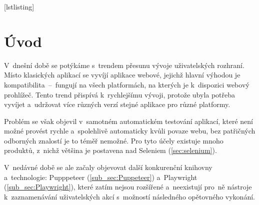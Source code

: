 \documentclass[12pt, a4paper, twoside]{article}
\begin{document}
	
\makeatletter


	[lstlisting]%
	\renewcommand*{\thellabel}{%
		\ifnum\value{llabel}<0 %
		\@ctrerr
		\else
		\ifnum\value{llabel}>10 %
		\@ctrerr
		\else
		\protect\ding{\the\numexpr\value{llabel}+201\relax}%
		\fi
		\fi
	}%

\newlength{\llabelsep}
\setlength{\llabelsep}{5pt}

\newcommand*{\llabel}[1]{%
	\begingroup
	\refstepcounter{llabel}%
	\label{#1}%
	\llap{%
		\thellabel\kern\llabelsep
		\hphantom{\lst@numberstyle\the\lst@lineno}%
		\kern\lst@numbersep
	}%
	\endgroup
}
\makeatother
	
	
	
	
	
	\ifdefined\printVersion
	\else
		\afterpage{\aftergroup\restoregeometry}
	\fi
		
	\tableofcontents
	\onehalfspacing
	\newpage
	\printglossary[title=Seznam nestandardních a~méně známých zkratek, toctitle=Seznam nestandardních a~méně známých zkratek, type=\acronymtype]
	\newpage
	\section{Úvod}
	V~dnešní době se potýkáme s~trendem přesunu vývoje uživatelských rozhraní. Místo klasických aplikací se vyvíjí aplikace webové, jejichž hlavní výhodou je kompatibilita~--~fungují na všech platformách, na kterých je k~dispozici webový prohlížeč. Tento trend přispívá k~rychlejšímu vývoji, protože ubyla potřeba vyvíjet a~udržovat více různých verzí stejné aplikace pro různé platformy. 
	
	Problém se však objevil v~samotném automatickém testování aplikací, které není možné provést rychle a~spolehlivě automaticky kvůli povaze webu, bez patřičných odborných znalostí je to téměř nemožné. Pro tyto účely existuje mnoho produktů, z~nichž většina je postavena nad Seleniem (\ref{sec:selenium}). 
	
	V~nedávné době se ale začaly objevovat další konkurenční knihovny a~technologie: Pupppeteer (\ref{sub_sec:Puppeteer}) a~Playwright (\ref{sub_sec:Playwright}), které zatím nejsou rozšířené a~neexistují pro~ně nástroje k~zaznamenávání uživatelských akcí s~možností následného opětovného vykonání.
	
\end{document}

